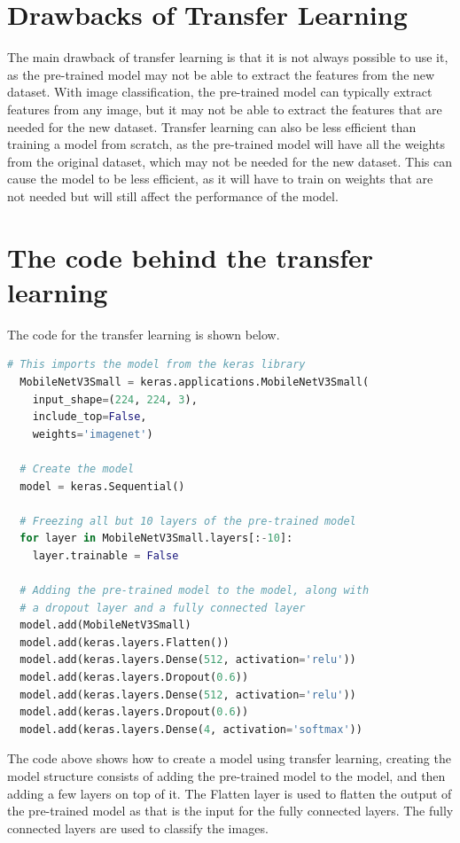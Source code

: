 \documentclass[]{final_report}
\begin{document}
\section{Drawbacks of Transfer Learning}
The main drawback of transfer learning is that it is not always possible to use it,
as the pre-trained model may not be able to extract the features from the new dataset.
With image classification, the pre-trained model can typically extract features from any image, but it may not be able to extract the features that are needed for the new dataset.
Transfer learning can also be less efficient than training a model from scratch, 
as the pre-trained model will have all the weights from the original dataset, which may not be needed for the new dataset.
This can cause the model to be less efficient, as it will have to train on weights that are not 
needed but will still affect the performance of the model.

\pagebreak
\section{The code behind the transfer learning}
The code for the transfer learning is shown below.

\begin{lstlisting}[language=Python]
  # This imports the model from the keras library
  MobileNetV3Small = keras.applications.MobileNetV3Small(
    input_shape=(224, 224, 3),
    include_top=False, 
    weights='imagenet')

  # Create the model
  model = keras.Sequential()

  # Freezing all but 10 layers of the pre-trained model
  for layer in MobileNetV3Small.layers[:-10]:
    layer.trainable = False

  # Adding the pre-trained model to the model, along with 
  # a dropout layer and a fully connected layer
  model.add(MobileNetV3Small)
  model.add(keras.layers.Flatten())
  model.add(keras.layers.Dense(512, activation='relu'))
  model.add(keras.layers.Dropout(0.6))
  model.add(keras.layers.Dense(512, activation='relu'))
  model.add(keras.layers.Dropout(0.6))
  model.add(keras.layers.Dense(4, activation='softmax'))
\end{lstlisting}

The code above shows how to create a model using transfer learning,
creating the model structure consists of adding the pre-trained model to the model, 
and then adding a few layers on top of it. The Flatten layer is used to flatten the output of the pre-trained model
as that is the input for the fully connected layers. The fully connected layers are used to classify the images.
\end{document}
